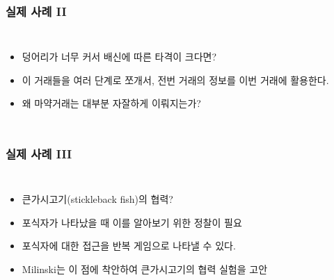 \documentclass[final]{beamer}
\begin{document}
\begin{frame}\frametitle{실제 사례 II}\vspace{2em}
\begin{columns}[c]
\column{16em}
\begin{itemize}
\item 덩어리가 너무 커서 배신에 따른 타격이 크다면?
\item 이 거래들을 여러 단계로 쪼개서, 전번 거래의 정보를 이번 거래에 활용한다. 
\item 왜 마약거래는 대부분 자잘하게 이뤄지는가? 
\end{itemize}
\column{14em}
\end{columns}
\end{frame}

\begin{frame}\frametitle{실제 사례 III}\vspace{2em}
\begin{columns}[c]
\column{16em}
\begin{itemize}
\item 큰가시고기(stickleback fish)의 협력?
\item 포식자가 나타났을 때 이를 알아보기 위한 정찰이 필요
\item 포식자에 대한 접근을 반복 게임으로 나타낼 수 있다. 
\item Milinski는 이 점에 착안하여 큰가시고기의 협력 실험을 고안 
\end{itemize}
\column{14em}
\hspace{-1.5em}
\end{columns}
\end{frame}
\end{document}

